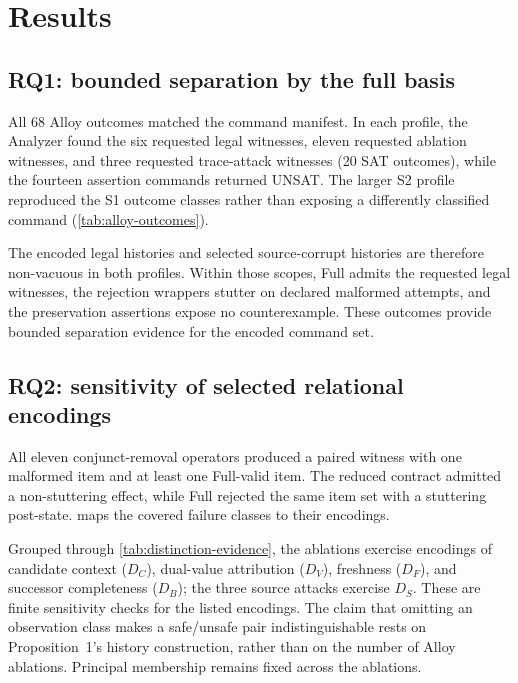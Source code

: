 \section{Results}
\label{sec:results}

\subsection{RQ1: bounded separation by the full basis}

All 68 Alloy outcomes matched the command manifest. In each profile, the Analyzer found the six requested legal witnesses, eleven requested ablation witnesses, and three requested trace-attack witnesses (20 SAT outcomes), while the fourteen assertion commands returned UNSAT. The larger S2 profile reproduced the S1 outcome classes rather than exposing a differently classified command (\cref{tab:alloy-outcomes}).

The encoded legal histories and selected source-corrupt histories are therefore non-vacuous in both profiles. Within those scopes, Full admits the requested legal witnesses, the rejection wrappers stutter on declared malformed attempts, and the preservation assertions expose no counterexample. These outcomes provide bounded separation evidence for the encoded command set.

\subsection{RQ2: sensitivity of selected relational encodings}

All eleven conjunct-removal operators produced a paired witness with one malformed item and at least one Full-valid item. The reduced contract admitted a non-stuttering effect, while Full rejected the same item set with a stuttering post-state.  maps the covered failure classes to their encodings.

Grouped through \cref{tab:distinction-evidence}, the ablations exercise encodings of candidate context ($D_C$), dual-value attribution ($D_V$), freshness ($D_F$), and successor completeness ($D_B$); the three source attacks exercise $D_S$. These are finite sensitivity checks for the listed encodings. The claim that omitting an observation class makes a safe/unsafe pair indistinguishable rests on Proposition~1's history construction, rather than on the number of Alloy ablations. Principal membership remains fixed across the ablations.

